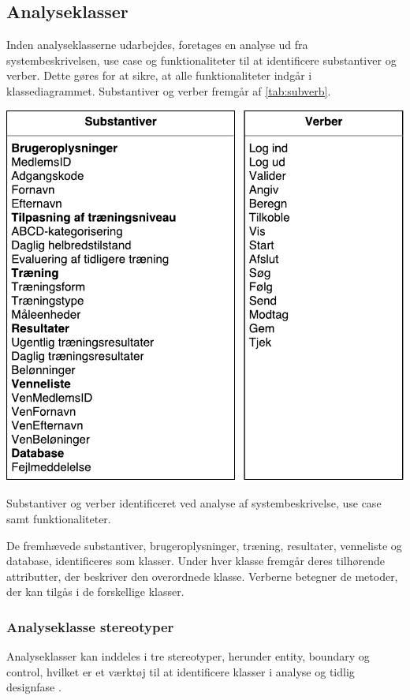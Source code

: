 \subsection*{Analyseklasser}
Inden analyseklasserne udarbejdes, foretages en analyse ud fra systembeskrivelsen, use case og funktionaliteter til at identificere substantiver og verber. Dette gøres for at sikre, at alle funktionaliteter indgår i klassediagrammet. Substantiver og verber fremgår af \autoref{tab:subverb}.

\begin{table}[H]
\centering
\includegraphics[width=1\textwidth]{figures/aktivitetsdiagram/substantiveverber}
\caption{Substantiver og verber identificeret ved analyse af systembeskrivelse, use case samt funktionaliteter.}
\label{tab:subverb}
\end{table}

\noindent
De fremhævede substantiver, brugeroplysninger, træning, resultater, venneliste og database, identificeres som klasser. Under hver klasse fremgår deres tilhørende attributter, der beskriver den overordnede klasse. Verberne betegner de metoder, der kan tilgås i de forskellige klasser. 


\subsubsection{Analyseklasse stereotyper}
Analyseklasser kan inddeles i tre stereotyper, herunder entity, boundary og control, hvilket er et værktøj til at identificere klasser i analyse og tidlig designfase \cite{RSC2002}.

